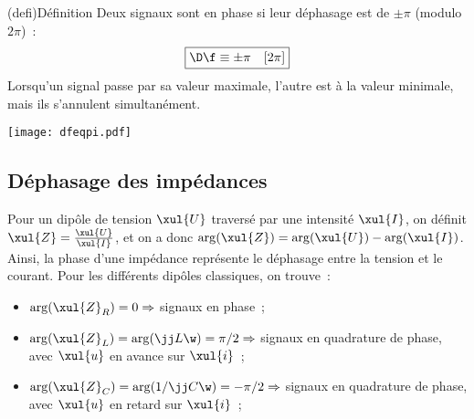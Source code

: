 \documentclass[../../main/main.tex]{subfiles}
\begin{document}
\begin{minipage}{0.70\linewidth}
	\begin{tcb}(defi){\small Définition}
		Deux signaux sont en phase si leur déphasage est de $\pm\pi$ (modulo $2\pi$)~:
		\[\boxed{\D\f \equiv \pm\pi \quad[2\pi]}\]
		Lorsqu'un signal passe par sa valeur maximale, l'autre est à la valeur
		minimale, mais ils s'annulent simultanément.
	\end{tcb}
\end{minipage}
\hfill
\begin{minipage}{0.30\linewidth}
	\begin{center}
		\texttt{[image: dfeqpi.pdf]}
	\end{center}
\end{minipage}

\subsection{Déphasage des impédances}
Pour un dipôle de tension $\xul{U}$ traversé par une intensité $\xul{I}$, on
définit $\xul{Z} = \frac{\xul{U}}{\xul{I}}$, et on a donc $\arg(\xul{Z}) =
	\arg(\xul{U}) - \arg(\xul{I})$. Ainsi, la phase d'une impédance représente le
déphasage entre la tension et le courant. Pour les différents dipôles
classiques, on trouve~:
\begin{itemize}
	\item $\arg(\xul{Z}_R) = 0 \Rightarrow$ signaux en phase~;
	\item $\arg(\xul{Z}_L) = \arg(\jj L\w) = \pi/2 \Rightarrow$ signaux en
	      quadrature de phase, avec $\xul{u}$ en avance sur $\xul{i}$~;
	\item $\arg(\xul{Z}_C) = \arg(1/\jj C\w) = -\pi/2 \Rightarrow$ signaux en
	      quadrature de phase, avec $\xul{u}$ en retard sur $\xul{i}$~;
\end{itemize}
\end{document}
